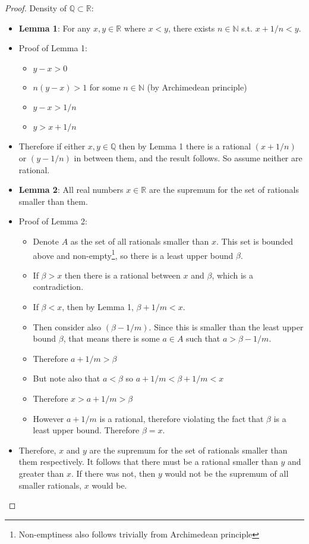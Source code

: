 \documentclass[12pt]{article}
\newcommand{\R}{\mathbb{R}}
\newcommand{\Q}{\mathbb{Q}}
\newcommand{\N}{\mathbb{N}}
\begin{document}
\begin{proof}
    
    Density of $\Q \subset \R$:
    
    \begin{itemize}
        \item \textbf{Lemma 1}: For any $x, y \in \R$ where $x < y$, there exists $n \in \N$ s.t. $x+ 1/n < y$.
        \item Proof of Lemma 1:
            \begin{itemize}
                \item $y - x > 0$
                \item $n(y-x) > 1$ for some $n \in \N$ (by Archimedean principle)
                \item $y-x > 1/n$
                \item $y > x + 1/n$
            \end{itemize}
        \item Therefore if either $x, y \in \Q$ then by Lemma 1 there is a rational $(x+1/n)$ or $(y-1/n)$ in between them, and the result follows. So assume neither are rational.
        \item \textbf{Lemma 2}: All real numbers $x \in \R$ are the supremum for the set of rationals smaller than them.
        \item Proof of Lemma 2:
            \begin{itemize}
                \item Denote $A$ as the set of all rationals smaller than $x$. This set is bounded above and non-empty\footnote{Non-emptiness also follows trivially from Archimedean principle}, so there is a least upper bound $\beta$.
                \item If $\beta > x$ then there is a rational between $x$ and $\beta$, which is a contradiction.
                \item If $\beta < x$, then by Lemma 1, $\beta + 1/m < x$.
                \item Then consider also $(\beta - 1/m)$. Since this is smaller than the least upper bound $\beta$, that means there is some $a \in A$ such that $a > \beta - 1/m$.
                \item Therefore $a + 1/m> \beta$
                \item But note also that $a < \beta$ so $a + 1/m < \beta + 1/m < x$
                \item Therefore $x > a + 1/m > \beta$
                \item However $a + 1/m$ is a rational, therefore violating the fact that $\beta$ is a least upper bound. Therefore $\beta = x$.
            \end{itemize}
        \item Therefore, $x$ and $y$ are the supremum for the set of rationals smaller than them respectively. It follows that there must be a rational smaller than $y$ and greater than $x$. If there was not, then $y$ would not be the supremum of all smaller rationals, $x$ would be.
    \end{itemize}
    
\end{proof}
\end{document}
